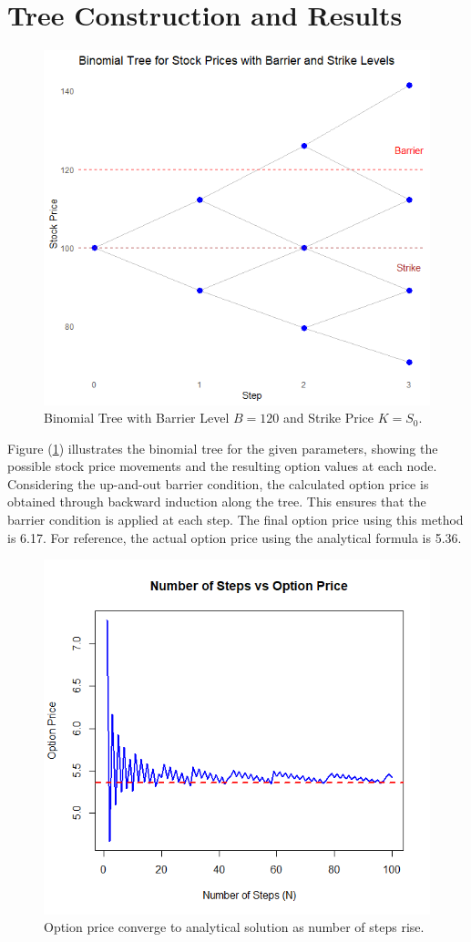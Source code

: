 \section{Tree Construction and Results}
\begin{figure}[h]
    \centering
    \includegraphics[width=.75\linewidth]{content/images/three-step.png}
    \caption{Binomial Tree with Barrier Level \(B = 120\) and Strike Price \(K = S_0\).}
    \label{fig:binomial-tree}
\end{figure}
Figure (\ref{fig:binomial-tree}) illustrates the binomial tree for the given parameters, showing the possible stock price movements and the resulting option values at each node. Considering the up-and-out barrier condition, the calculated option price is obtained through backward induction along the tree. This ensures that the barrier condition is applied at each step. The final option price using this method is 6.17. For reference, the actual option price using the analytical formula is 5.36.

\begin{figure}[h]
    \centering
    \includegraphics[width=.65\linewidth]{content/images/numstepsvsoptionprice.png}
    \caption{Option price converge to analytical solution as number of steps rise.}
    \label{fig:binom-nofsteps}
\end{figure}

